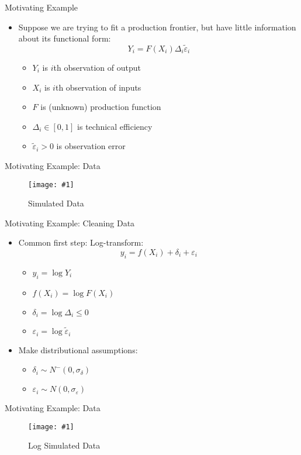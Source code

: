 \documentclass{beamer}
\newcommand{\ep}{\varepsilon}
\newcommand{\img}[1]{\texttt{[image: \#1]}}
\begin{document}
\begin{frame}{Motivating Example}
\begin{itemize}
	\item Suppose we are trying to fit a production frontier, but have little information about its functional form: $$Y_i = F(X_i)\Delta_i \tilde\ep_i$$
		\begin{itemize}
			\item $Y_i$ is $i$th observation of output
			\item $X_i$ is $i$th observation of inputs
			\item $F$ is (unknown) production function
			\item $\Delta_i\in[0, 1]$ is technical efficiency
			\item $\tilde\ep_i > 0$ is observation error
		\end{itemize}
\end{itemize}
\end{frame}

\begin{frame}{Motivating Example: Data}
\begin{figure}
	\centering
	\img{figures/data.pdf}
	\caption{Simulated Data}
\end{figure}
\end{frame}

\begin{frame}{Motivating Example: Cleaning Data}
\begin{itemize}
	\item Common first step: Log-transform: $$y_i = f(X_i) + \delta_i + \ep_i$$
		\begin{itemize}
			\item $y_i = \log Y_i$
			\item $f(X_i) = \log F(X_i)$
			\item $\delta_i = \log \Delta_i \leq 0$
			\item $\ep_i = \log \tilde\ep_i$
		\end{itemize}
	\item Make distributional assumptions:
		\begin{itemize}
			\item $\delta_i\sim N^-(0, \sigma_\delta)$
			\item $\ep_i\sim N(0, \sigma_\ep)$
		\end{itemize}
\end{itemize}
\end{frame}

\begin{frame}{Motivating Example: Data}
\begin{figure}
	\centering
	\img{figures/data-log.pdf}
	\caption{Log Simulated Data}
\end{figure}
\end{frame}
\end{document}
